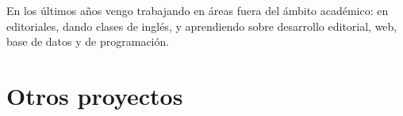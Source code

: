 \documentclass[a4paper,hidelinks]{twentysecondcv}
\begin{document}
En los últimos años vengo trabajando en áreas fuera del ámbito académico: en editoriales, dando clases de inglés, y aprendiendo sobre desarrollo editorial, web, base de datos y de programación.


\section{Otros proyectos}

\begin{twenty} %
\end{twenty}

\vfill 
\end{document}
